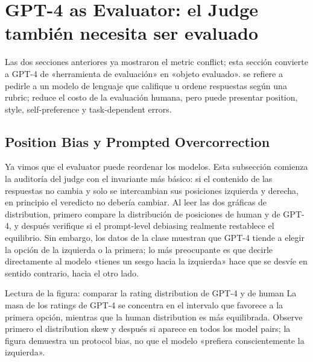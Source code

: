 \section{GPT-4 as Evaluator: el Judge también necesita ser evaluado}

Las dos secciones anteriores ya mostraron el metric conflict; esta sección convierte a GPT-4 de «herramienta de evaluación» en «objeto evaluado».  se refiere a pedirle a un modelo de lenguaje que califique u ordene respuestas según una rubric; reduce el costo de la evaluación humana, pero puede presentar position, style, self-preference y task-dependent errors.

\subsection{Position Bias y Prompted Overcorrection}

Ya vimos que el evaluator puede reordenar los modelos. Esta subsección comienza la auditoría del judge con el invariante más básico: si el contenido de las respuestas no cambia y solo se intercambian sus posiciones izquierda y derecha, en principio el veredicto no debería cambiar. Al leer las dos gráficas de distribution, primero compare la distribución de posiciones de human y de GPT-4, y después verifique si el prompt-level debiasing realmente restablece el equilibrio. Sin embargo, los datos de la clase muestran que GPT-4 tiende a elegir la opción de la izquierda o la primera; lo más preocupante es que decirle directamente al modelo «tienes un sesgo hacia la izquierda» hace que se desvíe en sentido contrario, hacia el otro lado.


\begin{knowledgebox}{Lectura de la figura: comparar la rating distribution de GPT-4 y de human}
La masa de los ratings de GPT-4 se concentra en el intervalo que favorece a la primera opción, mientras que la human distribution es más equilibrada. Observe primero el distribution skew y después si aparece en todos los model pairs; la figura demuestra un protocol bias, no que el modelo «prefiera conscientemente la izquierda».
\end{knowledgebox}


